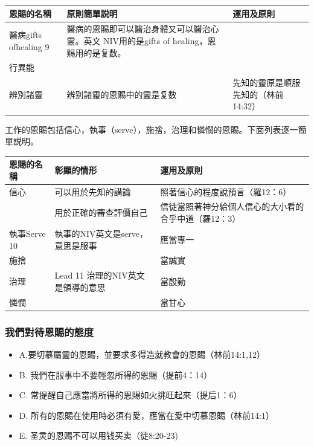 \begin{table}[H]
\centering
\begin{tabular}{p{6.145em}|p{30.785em}|p{12.5em}}\toprule
 \multicolumn{1}{p{6.215em}|}{\textbf{恩賜的名稱}} & \multicolumn{1}{p{5.215em}|}{\textbf{原則簡單説明}} & \textbf{運用及原則} \\\midrule
醫病gifts ofhealing 9& 醫病的恩賜即可以醫治身體又可以醫治心靈。英文
NIV用的是gifts of healing，恩赐用的是复数。&\\\midrule
行異能&&\\\midrule
辨別諸靈&辨别諸靈的恩赐中的靈是复数& 先知的靈原是順服先知的（林前14:32）\\\midrule
\end{tabular}%
\end{table}%

工作的恩賜包括信心，執事（serve），施捨，治理和憐憫的恩賜。下面列表逐一簡單説明。

\begin{table}[H]
\centering
\begin{tabular}{p{6.145em}|p{30.785em}|p{12.5em}}\toprule
 \multicolumn{1}{p{6.215em}|}{\textbf{恩賜的名稱}} & \multicolumn{1}{p{5.215em}|}{\textbf{彰顯的情形}} & \textbf{運用及原則} \\\midrule

信心& 可以用於先知的講論& 照著信心的程度說預言（羅12：6）\\\midrule
&用於正確的審查評價自己&信徒當照著神分給個人信心的大小看的合乎中道（羅12：3）\\\midrule

執事Serve 10 &執事的NIV英文是serve，意思是服事&應當專一\\\midrule
施捨&& 當誠實\\\midrule
治理& Lead 11 治理的NIV英文是領導的意思& 當殷勤\\\midrule
憐憫&& 當甘心\\    \bottomrule
\end{tabular}%
\end{table}%

\subsubsection{我們對待恩賜的態度}
\begin{itemize}
\item A.要切慕屬靈的恩賜，並要求多得造就教會的恩賜（林前14:1,12）
\item B. 我們在服事中不要輕忽所得的恩賜（提前4：14）
\item C. 常提醒自己應當將所得的恩賜如火挑旺起來（提后1：6）
\item D. 所有的恩賜在使用時必須有愛，應當在愛中切慕恩賜（林前14:1）
\item E. 圣灵的恩赐不可以用钱买卖（徒8:20-23)
\end{itemize}

